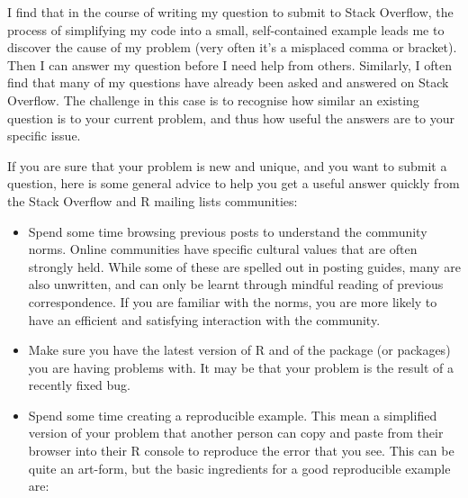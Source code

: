 \documentclass[]{book}
\begin{document}
I find that in the course of writing my question to submit to Stack
Overflow, the process of simplifying my code into a small,
self-contained example leads me to discover the cause of my problem
(very often it's a misplaced comma or bracket). Then I can answer my
question before I need help from others. Similarly, I often find that
many of my questions have already been asked and answered on Stack
Overflow. The challenge in this case is to recognise how similar an
existing question is to your current problem, and thus how useful the
answers are to your specific issue.

If you are sure that your problem is new and unique, and you want to
submit a question, here is some general advice to help you get a useful
answer quickly from the Stack Overflow and R mailing lists communities:

\begin{itemize}
\item
  Spend some time browsing previous posts to understand the community
  norms. Online communities have specific cultural values that are often
  strongly held. While some of these are spelled out in posting guides,
  many are also unwritten, and can only be learnt through mindful
  reading of previous correspondence. If you are familiar with the
  norms, you are more likely to have an efficient and satisfying
  interaction with the community.
\item
  Make sure you have the latest version of R and of the package (or
  packages) you are having problems with. It may be that your problem is
  the result of a recently fixed bug.
\item
  Spend some time creating a reproducible example. This mean a
  simplified version of your problem that another person can copy and
  paste from their browser into their R console to reproduce the error
  that you see. This can be quite an art-form, but the basic ingredients
  for a good reproducible example are:
\end{itemize}
\end{document}
